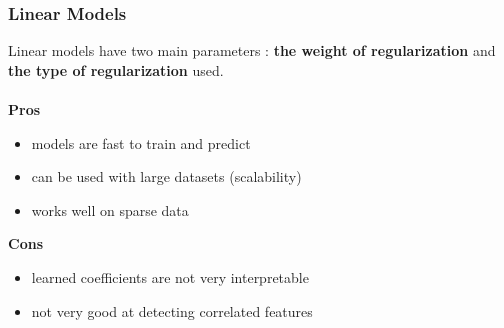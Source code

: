 \documentclass{beamer}
\begin{document}
\begin{frame}
  \frametitle{Linear Models}
  Linear models have two
  main parameters : \textbf{the weight of regularization} and \textbf{the
  type of regularization} used.
  \\~\\
  \textbf{Pros}
  \begin{itemize}
    \item models are fast to train and predict
    \item can be used with large datasets (scalability)
    \item works well on sparse data
  \end{itemize}

  \textbf{Cons}
  \begin{itemize}
    \item learned coefficients are not very interpretable
    \item not very good at detecting correlated features
  \end{itemize}
\end{frame}

\end{document}
